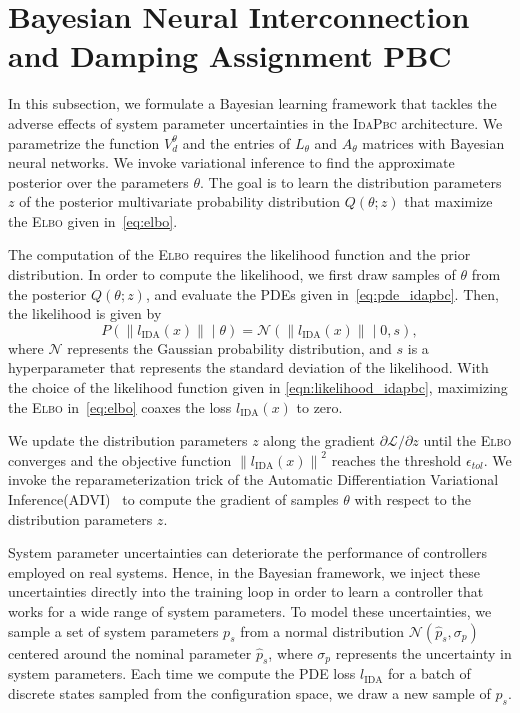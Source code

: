 
\section{Bayesian Neural Interconnection and Damping Assignment PBC}

In this subsection, we formulate a Bayesian learning framework that tackles the
adverse effects of system parameter uncertainties in the \textsc{IdaPbc}
architecture.
%
We parametrize the function $V_d^\theta$ and the entries of $L_\theta$ and
$A_\theta$ matrices with Bayesian neural networks. 
%
We invoke variational inference to find the approximate posterior over the
parameters $\theta$. The goal is to learn the distribution parameters $z$ of the
posterior multivariate probability distribution $Q(\theta;z)$ that maximize the
\textsc{Elbo} given in~\eqref{eq:elbo}.
%

The computation of the \textsc{Elbo} requires the likelihood function and the
prior distribution.
%
In order to compute the likelihood, we first draw samples of $\theta$ from the
posterior $Q(\theta;z)$, and evaluate the PDEs given in~\eqref{eq:pde_idapbc}.
Then, the likelihood is given by
\begin{equation}
    P( \left\| l_{\textrm{IDA}} (x) \right\| \mid \theta) = \mathcal{N}\left(\left\| l_{\textrm{IDA}} (x) \right\| \; | \; 0, s \right),
    \label{eqn:likelihood_idapbc}
\end{equation}
where $\mathcal{N}$ represents the Gaussian probability distribution, and $s$ is
a hyperparameter that represents the standard deviation of the likelihood.
%
With the choice of the likelihood function given in
\eqref{eqn:likelihood_idapbc}, maximizing the \textsc{Elbo}
in~\eqref{eq:elbo} coaxes the loss $l_{\text{IDA}}(x)$ to zero.


%
We update the distribution parameters $z$ along the gradient $\partial
\mathcal{L}/\partial z$ until the \textsc{Elbo} converges and the objective
function $\left\| l_{\textrm{IDA}} (x) \right\|^2$ reaches the threshold
$\epsilon_{tol}$.
%
We invoke the reparameterization trick of the Automatic Differentiation
Variational Inference(\textsc{ADVI})~\cite{kucukelbir2015automatic} to compute
the gradient of samples $\theta$ with respect to the distribution parameters
$z$.


System parameter uncertainties can deteriorate the performance of controllers
employed on real systems. 
%
Hence, in the Bayesian framework, we inject these uncertainties directly into
the training loop in order to learn a controller that works for a wide range of
system parameters.
%
To model these uncertainties, we sample a set of system parameters $p_s$ from
a normal distribution $\mathcal{N}(\hat{p}_s, \sigma_{p})$ centered around the
nominal parameter $\hat{p}_s$, where $\sigma_{p}$ represents the uncertainty
in system parameters.
%
Each time we compute the PDE loss $l_{\text{IDA}}$ for a batch of discrete
states sampled from the configuration space, we draw a new sample
of $p_s$.
